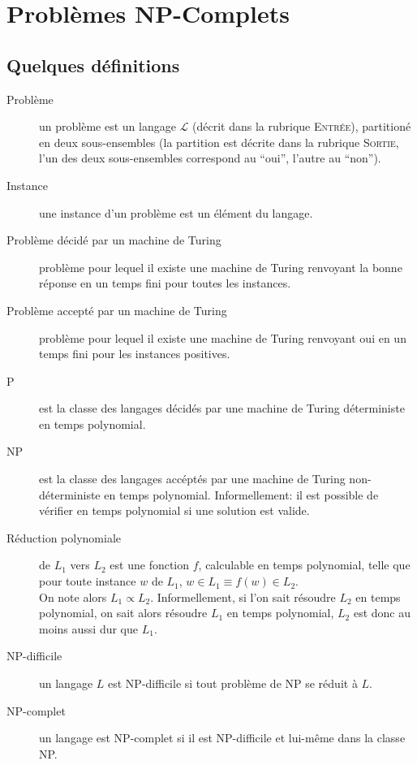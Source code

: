 \section*{Problèmes NP-Complets}

\subsection*{Quelques définitions}
\begin{description}
\item[Problème] un problème est un langage $\mathcal{L}$ (décrit dans
  la rubrique \textsc{Entrée}), partitioné en deux sous-ensembles (la
  partition est décrite dans la rubrique \textsc{Sortie}, l'un des
  deux sous-ensembles correspond au ``oui'', l'autre au ``non'').
\item[Instance] une instance d'un problème est un élément du langage.
\item[Problème décidé par un machine de Turing] problème pour lequel il
  existe une machine de Turing renvoyant la bonne réponse en un temps
  fini pour toutes les instances.
\item[Problème accepté par un machine de Turing] problème pour lequel
  il existe une machine de Turing renvoyant oui en un temps fini pour
  les instances positives.
\item[P] est la classe des langages décidés par une machine
  de Turing déterministe en temps polynomial.
\item[NP] est la classe des langages accéptés par une machine
  de Turing non-déterministe en temps polynomial. Informellement: il
  est possible de vérifier en temps polynomial si une solution est
  valide.
\item[Réduction polynomiale] de $L_{1}$ vers $L_{2}$ est une fonction
  $f$, calculable en temps polynomial, telle que pour toute instance
  $w$ de
  $L_{1}$, $w \in L_{1} \equiv f(w) \in L_{2}$.\\
  On note alors $L_{1} \propto L_{2}$. Informellement, si l'on sait
  résoudre $L_{2}$ en temps polynomial, on sait alors résoudre $L_{1}$
  en temps polynomial, $L_{2}$ est donc au moins aussi dur que
  $L_{1}$.
\item[NP-difficile] un langage $L$ est NP-difficile si tout problème de NP
  se réduit à $L$.
\item[NP-complet] un langage est NP-complet si il est NP-difficile et
  lui-même dans la classe NP.
\end{description}

